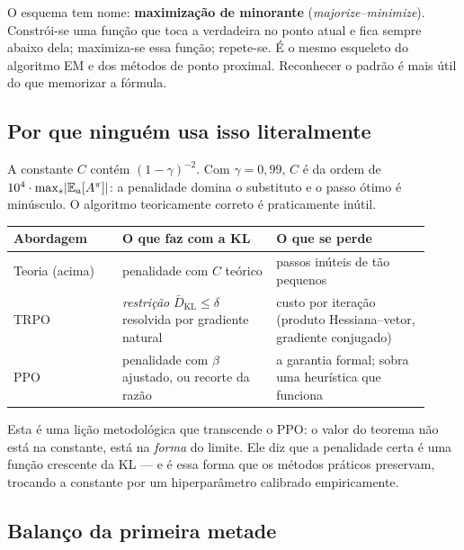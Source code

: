 \documentclass[11pt]{article}
\newcommand{\Advpi}{A^{\pol}}
\begin{document}
\begin{ideiabox}
  O esquema tem nome: \textbf{maximização de minorante} (\emph{majorize--minimize}).
  Constrói-se uma função que toca a verdadeira no ponto atual e fica sempre abaixo dela;
  maximiza-se essa função; repete-se. É o mesmo esqueleto do algoritmo EM e dos métodos
  de ponto proximal. Reconhecer o padrão é mais útil do que memorizar a fórmula.
\end{ideiabox}

\subsection{Por que ninguém usa isso literalmente}

A constante $C$ contém $(1-\gamma)^{-2}$. Com $\gamma = 0{,}99$, $C$ é da ordem de
$10^4\cdot\max_s\abs{\E_a[\Advpi]}$: a penalidade domina o substituto e o passo ótimo é
minúsculo. O algoritmo teoricamente correto é praticamente inútil.

\begin{center}\small
\begin{tabular}{@{}>{\raggedright\arraybackslash}p{0.24\linewidth}
                 >{\raggedright\arraybackslash}p{0.34\linewidth}
                 >{\raggedright\arraybackslash}p{0.34\linewidth}@{}}
\toprule
\textbf{Abordagem} & \textbf{O que faz com a KL} & \textbf{O que se perde} \\
\midrule
Teoria (acima) & penalidade com $C$ teórico & passos inúteis de tão pequenos \\
TRPO & \emph{restrição} $\bar D_{\mathrm{KL}} \le \delta$ resolvida por gradiente natural &
  custo por iteração (produto Hessiana--vetor, gradiente conjugado) \\
PPO & penalidade com $\beta$ ajustado, ou recorte da razão &
  a garantia formal; sobra uma heurística que funciona \\
\bottomrule
\end{tabular}
\end{center}

\begin{alertabox}
  Esta é uma lição metodológica que transcende o PPO: o valor do teorema não está na
  constante, está na \emph{forma} do limite. Ele diz que a penalidade certa é uma função
  crescente da KL --- e é essa forma que os métodos práticos preservam, trocando a
  constante por um hiperparâmetro calibrado empiricamente.
\end{alertabox}

\subsection{Balanço da primeira metade}
\end{document}

